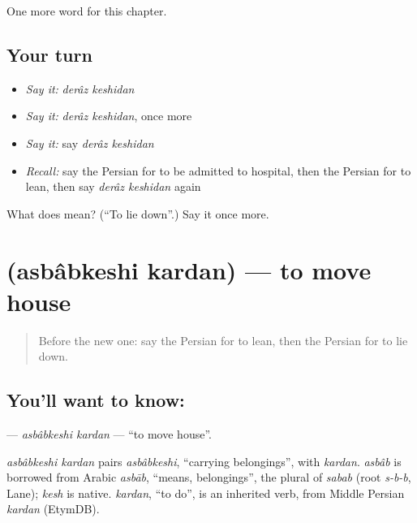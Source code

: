 \begin{grammarlens}[title={What you've built}]
One more word for this chapter.
\end{grammarlens}

\subsection*{Your turn}
\begin{itemize}
\raggedright
  \item \emph{Say it:} \emph{derâz keshidan}
  \item \emph{Say it:} \emph{derâz keshidan}, once more
  \item \emph{Say it:} say \emph{derâz keshidan}
  \item \emph{Recall:} say the Persian for to be admitted to hospital, then the Persian for to lean, then say \emph{derâz keshidan} again
\end{itemize}

\begin{tcolorbox}[breakable,colback=teal!4,colframe=teal!35!black,title={Before you move on}]
What does   mean? (\textquotedblleft{}To lie down\textquotedblright{}.) Say it once more.
\end{tcolorbox}
\section[\texorpdfstring{\fa{اسباب} \fa{کشی} \fa{کردن} (asbâbkeshi kardan)}{اسباب کشی کردن (asbâbkeshi kardan)}]{   (asbâbkeshi kardan) — to move house}

\label{lesson:FA-C261-asbabkeshi-kardan}



\begin{quote}
Before the new one: say the Persian for to lean, then the Persian for to lie down.
\end{quote}

\subsection*{You'll want to know:   }
\textbf{  } — \emph{asbâbkeshi kardan} — \textquotedblleft{}to move house\textquotedblright{}.

\begin{cousinweb}
\emph{asbâbkeshi kardan} pairs \emph{asbâbkeshi}, \textquotedblleft{}carrying belongings\textquotedblright{}, with \emph{kardan}. \emph{asbâb} is borrowed from Arabic \emph{asbāb}, \textquotedblleft{}means, belongings\textquotedblright{}, the plural of \emph{sabab} (root \emph{s-b-b}, Lane); \emph{kesh} is native. \emph{kardan}, \textquotedblleft{}to do\textquotedblright{}, is an inherited verb, from Middle Persian \emph{kardan} (EtymDB).
\end{cousinweb}


